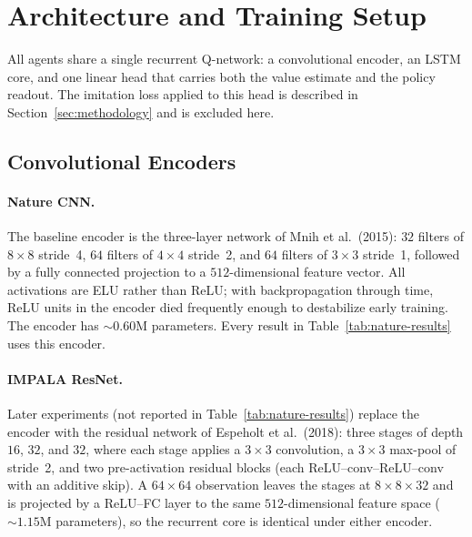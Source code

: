 
\section{Architecture and Training Setup}
\label{sec:architecture}

All agents share a single recurrent Q-network: a convolutional encoder, an
LSTM core, and one linear head that carries both the value estimate and the
policy readout. The imitation loss applied to this head is described in
Section~\ref{sec:methodology} and is excluded here.

\subsection{Convolutional Encoders}

\paragraph{Nature CNN.} The baseline encoder is the three-layer network of
Mnih et al.\ (2015): $32$ filters of $8{\times}8$ stride~4, $64$ filters of
$4{\times}4$ stride~2, and $64$ filters of $3{\times}3$ stride~1, followed by
a fully connected projection to a $512$-dimensional feature vector. All
activations are ELU rather than ReLU; with backpropagation through time,
ReLU units in the encoder died frequently enough to destabilize early
training. The encoder has ${\sim}0.60$M parameters. Every result in
Table~\ref{tab:nature-results} uses this encoder.

\paragraph{IMPALA ResNet.} Later experiments (not reported in
Table~\ref{tab:nature-results}) replace the encoder with the residual
network of Espeholt et al.\ (2018): three stages of depth $16$, $32$, and
$32$, where each stage applies a $3{\times}3$ convolution, a $3{\times}3$
max-pool of stride~2, and two pre-activation residual blocks (each
ReLU--conv--ReLU--conv with an additive skip). A $64{\times}64$ observation
leaves the stages at $8{\times}8{\times}32$ and is projected by a ReLU--FC
layer to the same $512$-dimensional feature space (${\sim}1.15$M
parameters), so the recurrent core is identical under either encoder.

